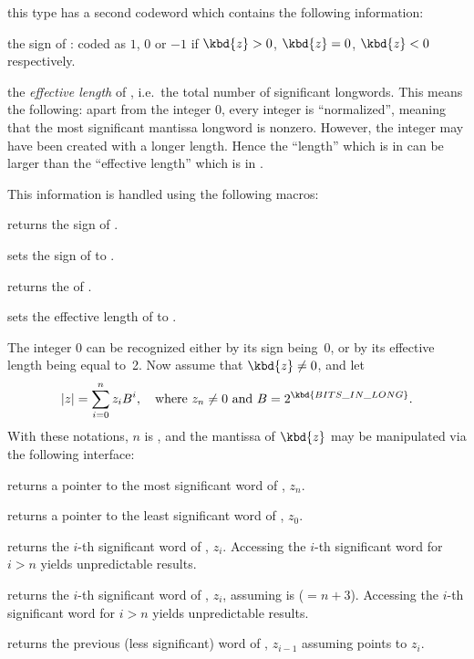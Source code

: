 this type has a second codeword  which
contains the following information:

the sign of : coded as $1$, $0$ or $-1$ if $\kbd{z} > 0$, $\kbd{z} = 0$,
$\kbd{z} < 0$ respectively.

the \emph{effective length} of , i.e.~the total number of significant
longwords. This means the following: apart from the integer 0, every integer
is ``normalized'', meaning that the most significant mantissa longword is
nonzero. However, the integer may have been created with a longer length.
Hence the ``length'' which is in  can be larger than the
``effective length'' which is in .

\noindent This information is handled using the following macros:

 returns the sign of .

 sets the sign of  to .

 returns the  of .

 sets the effective length
of  to .

The integer 0 can be recognized either by its sign being~0, or by its
effective length being equal to~2. Now assume that $\kbd{z} \ne 0$, and let
$$ |z| = \sum_{i = 0}^n z_i B^i,
  \quad\text{where}~z_n\ne 0~\text{and}~B = 2^{\kbd{BITS\_IN\_LONG}}.
$$
With these notations, $n$ is , and the mantissa of
$\kbd{z}$ may be manipulated via the following interface:

 returns a pointer to the most significant word of
, $z_n$.

 returns a pointer to the least significant word of
, $z_0$.

 returns the $i$-th significant word of
, $z_i$. Accessing the $i$-th significant word for $i > n$
yields unpredictable results.

 returns the $i$-th significant
word of , $z_i$, assuming  is  ($= n + 3$).
Accessing the $i$-th significant word for $i > n$ yields unpredictable
results.

 returns the previous (less significant) word of
, $z_{i-1}$ assuming  points to $z_i$.

